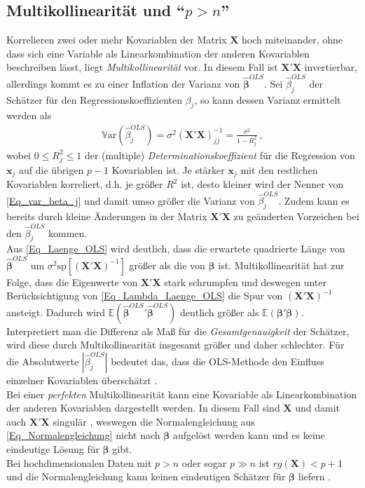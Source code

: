 \documentclass[12pt, a4paper]{report}\usepackage[]{graphicx}\usepackage[]{color}
\begin{document}
\subsection{Multikollinearität und "`$p > n$"'}\label{Kap_Multikollinearität und $p > n$}
Korrelieren zwei oder mehr Kovariablen der Matrix $\mathbf{X}$ hoch miteinander, ohne dass sich eine Variable als Linearkombination der anderen Kovariablen beschreiben lässt, liegt \textit{Multikollinearität} vor. In diesem Fall ist $\mathbf{X}'\mathbf{X}$ invertierbar, allerdings kommt es zu einer Inflation der Varianz von $\boldsymbol{\hat{\beta}}^{OLS}$. Sei $\hat{\beta}_j^{OLS}$ der Schätzer für den Regressionskoeffizienten $\beta_j$, so kann dessen Varianz ermittelt werden als
\begin{align}\label{Eq_var_beta_j}
\mathbb{V}\text{ar}(\hat{\beta}_j^{OLS})=\sigma^2 (\mathbf{X}'\mathbf{X})^{-1}_{jj}=\frac{\sigma^2}{1-R^2_j} \ ,
\end{align}  
wobei $0 \leq R^2_j \leq 1$ der (multiple) \textit{Determinationskoeffizient} für die Regression von $\mathbf{x}_j$ auf die übrigen $p-1$ Kovariablen ist. Je stärker $\mathbf{x}_j$ mit den restlichen Kovariablen korreliert, d.h. je größer $R^2$ ist, desto kleiner wird der Nenner von \eqref{Eq_var_beta_j} und damit umso größer die Varianz von $\hat{\beta}_j^{OLS}$. Zudem kann es bereits durch kleine Änderungen in der Matrix $\mathbf{X}'\mathbf{X}$ zu geänderten Vorzeichen bei den $\hat{\beta}_j^{OLS}$ kommen.\\
Aus \eqref{Eq_Laenge_OLS} wird deutlich, dass die erwartete quadrierte Länge von $\boldsymbol{\hat{\beta}}^{OLS}$ um $\sigma^2 \text{sp}[(\mathbf{X}'\mathbf{X})^{-1}]$ größer als die von $\boldsymbol{\beta}$ ist. Multikollinearität hat zur Folge, dass die Eigenwerte von $\mathbf{X}'\mathbf{X}$ stark schrumpfen und deswegen unter Berücksichtigung von \eqref{Eq_Lambda_Laenge_OLS} die Spur von $(\mathbf{X}'\mathbf{X})^{-1}$ ansteigt. Dadurch wird $\mathbb{E}(\boldsymbol{\hat{\beta}}^{OLS}{'} \boldsymbol{\hat{\beta}}^{OLS})$ deutlich größer als $\mathbb{E}(\boldsymbol{\beta}' \boldsymbol{\beta})$. Interpretiert man die Differenz als Maß für die \textit{Gesamtgenauigkeit} der Schätzer, wird diese durch Multikollinearität insgesamt größer und daher schlechter. Für die Absolutwerte $|\hat{\beta}_j^{OLS}|$ bedeutet das, dass die OLS-Methode den Einfluss einzelner Kovariablen überschätzt \cite{Marquardt1975RidgePractice,Brook1980ExpectedLengthOLS}.\\
Bei einer \textit{perfekten} Multikollinearität kann eine Kovariable als Linearkombination der anderen Kovariablen dargestellt werden. In diesem Fall sind $\mathbf{X}$ und damit auch $\mathbf{X}'\mathbf{X}$ singulär \cite{strang09ointro_linalg}, weswegen die Normalengleichung aus \eqref{Eq_Normalengleichung} nicht nach $\boldsymbol{\beta}$ aufgelöst werden kann und es keine eindeutige Lösung für $\boldsymbol{\beta}$ gibt.\\
Bei hochdimensionalen Daten mit $p>n$ oder sogar $p \gg n$ ist $rg(\mathbf{X}) < p+1$ und die Normalengleichung kann keinen eindeutigen Schätzer für $\boldsymbol{\beta}$ liefern \cite{johnstone_statistical_2009}.\\
\end{document}
